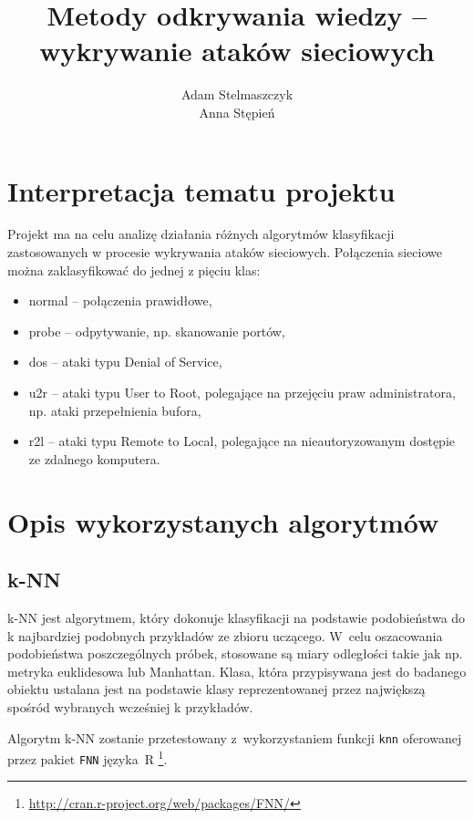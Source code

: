 \documentclass[a4paper, 12pt]{article}
\title{Metody odkrywania wiedzy -- wykrywanie ataków sieciowych}
\author{Adam Stelmaszczyk\\ Anna Stępień}
\begin{document}
\maketitle

\tableofcontents

\newpage

\section{Interpretacja tematu projektu}
Projekt ma na celu analizę działania różnych algorytmów klasyfikacji zastosowanych
w procesie wykrywania ataków sieciowych. Połączenia sieciowe można zaklasyfikować do jednej
z pięciu klas:
\begin{itemize}
  \item normal -- połączenia prawidłowe,
  \item probe -- odpytywanie, np. skanowanie portów,
  \item dos -- ataki typu Denial of Service,
  \item u2r -- ataki typu User to Root, polegające na przejęciu praw administratora, 
np. ataki przepełnienia bufora,
  \item r2l -- ataki typu Remote to Local, polegające na nieautoryzowanym dostępie ze zdalnego komputera.
\end{itemize} 

\section{Opis wykorzystanych algorytmów}\label{algorithms}

\subsection{k-NN}

k-NN jest algorytmem, który dokonuje klasyfikacji na podstawie podobieństwa do k 
najbardziej podobnych przykładów ze zbioru uczącego. W~celu oszacowania podobieństwa 
poszczególnych próbek, stosowane są miary odległości takie jak np. metryka euklidesowa lub Manhattan. 
Klasa, która przypisywana jest do badanego obiektu ustalana jest na podstawie klasy 
reprezentowanej przez największą spośród wybranych wcześniej k przykładów.

Algorytm k-NN zostanie przetestowany z~wykorzystaniem funkcji 
\texttt{knn} oferowanej przez pakiet \texttt{FNN} języka~R 
\footnote{\url{http://cran.r-project.org/web/packages/FNN/}}.
\end{document}
